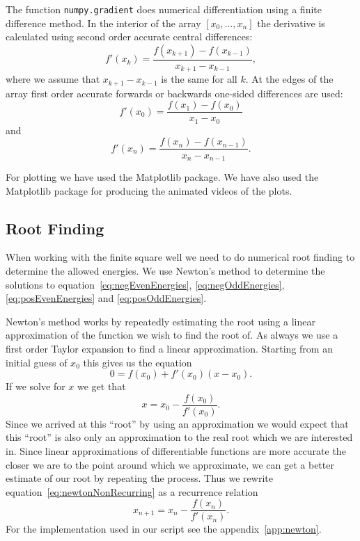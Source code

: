 \documentclass[12pt,a4paper]{article}
\begin{document}
The function \lstinline{numpy.gradient} does numerical differentiation using a finite difference method. In the interior of the array $[x_0, \ldots, x_n]$ the derivative is calculated using second order accurate central differences:
\begin{equation}
f'(x_k) = \frac{f(x_{k + 1}) - f(x_{k - 1})}{x_{k + 1} - x_{k - 1}},
\end{equation}
where we assume that $x_{k + 1} - x_{k - 1}$ is the same for all $k$. At the edges of the array first order accurate forwards or backwards one-sided differences are used:
\begin{equation}
f'(x_0) = \frac{f(x_1) - f(x_0)}{x_1 - x_0}
\end{equation}
and
\begin{equation}
f'(x_n) = \frac{f(x_n) - f(x_{n - 1})}{x_n - x_{n - 1}}.
\end{equation}

For plotting we have used the Matplotlib package. We have also used the Matplotlib package for producing the animated videos of the plots.

\subsection{Root Finding}
When working with the finite square well we need to do numerical root finding to determine the allowed energies. We use Newton's method to determine the solutions to equation~\eqref{eq:negEvenEnergies}, \eqref{eq:negOddEnergies}, \eqref{eq:posEvenEnergies} and \eqref{eq:posOddEnergies}.

Newton's method works by repeatedly estimating the root using a linear approximation of the function we wish to find the root of. As always we use a first order Taylor expansion to find a linear approximation. Starting from an initial guess of $x_0$ this gives us the equation
\begin{equation}
0 = f(x_0) + f'(x_0)(x - x_0).
\end{equation}
If we solve for $x$ we get that
\begin{equation}
x = x_0 - \frac{f(x_0)}{f'(x_0)}. \label{eq:newtonNonRecurring}
\end{equation}
Since we arrived at this ``root'' by using an approximation we would expect that this ``root'' is also only an approximation to the real root which we are interested in. Since linear approximations of differentiable functions are more accurate the closer we are to the point around which we approximate, we can get a better estimate of our root by repeating the process. Thus we rewrite equation~\eqref{eq:newtonNonRecurring} as a recurrence relation
\begin{equation}
x_{n+1} = x_n - \frac{f(x_n)}{f'(x_n)}.
\end{equation}
For the implementation used in our script see the appendix~\ref{app:newton}.
\end{document}
